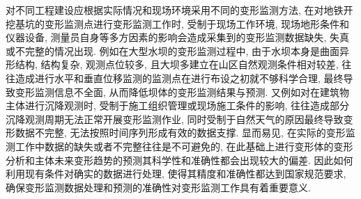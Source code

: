 对不同工程建设应根据实际情况和现场环境采用不同的变形监测方法, 在对地铁开挖基坑的变形监测点进行变形监测工作时, 受制于现场工作环境, 现场地形条件和仪器设备, 测量员自身等多方因素的影响会造成采集到的变形监测数据缺失, 失真或不完整的情况出现. 例如在大型水坝的变形监测过程中, 由于水坝本身是曲面异形结构, 结构复杂, 观测点位较多, 且大坝多建立在山区自然观测条件相对较差, 往往造成进行水平和垂直位移监测的监测点在进行布设之初就不够科学合理, 最终导致变形监测信息不全面, 从而降低坝体的变形监测结果与预测. 又例如对在建筑物主体进行沉降观测时, 受制于施工组织管理或现场施工条件的影响, 往往造成部分沉降观测周期无法正常开展变形监测作业, 同时受制于自然天气的原因最终导致变形数据不完整, 无法按照时间序列形成有效的数据支撑. 显而易见, 在实际的变形监测工作中数据的缺失或者不完整往往是不可避免的, 在此基础上进行变形体的变形分析和主体未来变形趋势的预测其科学性和准确性都会出现较大的偏差. 因此如何利用现有条件对确实的数据进行处理, 使得其精度和准确性都达到国家规范要求, 确保变形监测数据处理和预测的准确性对变形监测工作具有着重要意义. 